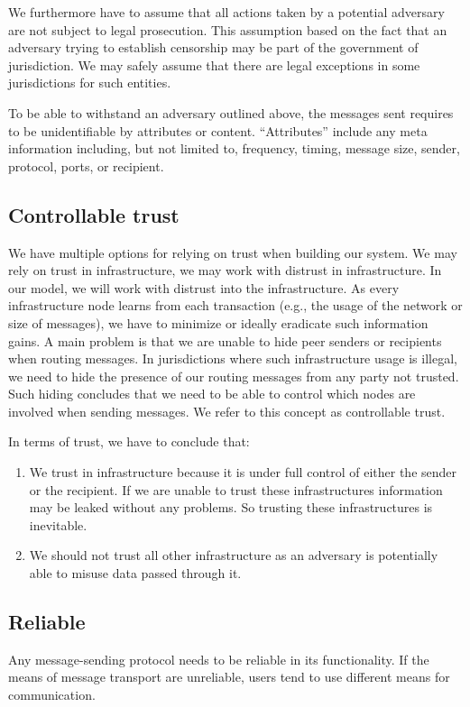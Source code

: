 We furthermore have to assume that all actions taken by a potential adversary are not subject to legal prosecution. This assumption based on the fact that an adversary trying to establish censorship may be part of the government of jurisdiction. We may safely assume that there are legal exceptions in some jurisdictions for such entities.

To be able to withstand an adversary outlined above, the messages sent requires to be unidentifiable by attributes or content. ``Attributes'' include any meta information including, but not limited to, frequency, timing, message size, sender, protocol, ports, or recipient.

\subsection{Controllable trust}
We have multiple options for relying on trust when building our system. We may rely on trust in infrastructure, we may work with distrust in infrastructure. In our model, we will work with distrust into the infrastructure. As every infrastructure node learns from each transaction (e.g., the usage of the network or size of messages), we have to minimize or ideally eradicate such information gains. A main problem is that we are unable to hide peer senders or recipients when routing messages. In jurisdictions where such infrastructure usage is illegal, we need to hide the presence of our routing messages from any party not trusted. Such hiding concludes that we need to be able to control which nodes are involved when sending messages. We refer to this concept as controllable trust.

In terms of trust, we have to conclude that:
\begin{enumerate}
	\item We trust in infrastructure because it is under full control of either the sender or the recipient. If we are unable to trust these infrastructures information may be leaked without any problems. So trusting these infrastructures is inevitable.
	\item We should not trust all other infrastructure as an adversary is potentially able to misuse data passed through it.
\end{enumerate}

\subsection{Reliable}
Any message-sending protocol needs to be reliable in its functionality. If the means of message transport are unreliable, users tend to use different means for communication\cite{zhou2011examining}. 

